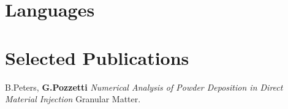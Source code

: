 \documentclass[11pt,a4paper]{moderncv}
\begin{document}




% 







\section{Languages}
\begin{minipage}[b]{.3\linewidth}
\end{minipage}
\begin{minipage}[b]{.3\linewidth}
\end{minipage}
\begin{minipage}[b]{.3\linewidth}
\end{minipage}

\section{Selected Publications}
\small
{} {B.Peters, \textbf{G.Pozzetti}
\textit{Numerical Analysis of Powder Deposition in Direct Material Injection} Granular Matter.}
\end{document}
